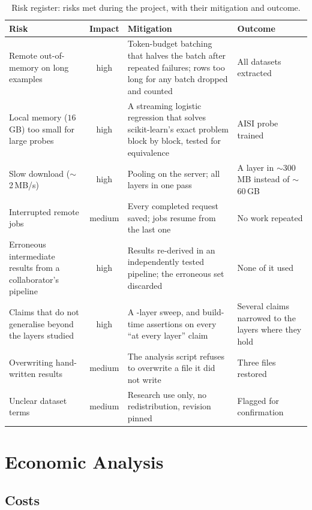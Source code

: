 \begin{table}[t]
\centering
\small
\caption{Risk register: risks met during the project, with their mitigation and outcome.}
\label{tab:risk}
\begin{tabularx}{\linewidth}{@{}>{\raggedright\arraybackslash}p{3.0cm} c >{\raggedright\arraybackslash}X >{\raggedright\arraybackslash}p{3.1cm}@{}}
\toprule
Risk & Impact & Mitigation & Outcome \\
\midrule
Remote out-of-memory on long examples & high & Token-budget batching that halves the batch after
repeated failures; rows too long for any batch dropped and counted & All datasets extracted \\
Local memory ($16$\,GB) too small for large probes & high & A streaming logistic regression that
solves scikit-learn's exact problem block by block, tested for equivalence & AISI probe trained \\
Slow download ($\sim$2\,MB/s) & high & Pooling on the server; all layers in one pass & A layer in
$\sim$300\,MB instead of $\sim$60\,GB \\
Interrupted remote jobs & medium & Every completed request saved; jobs resume from the last one &
No work repeated \\
Erroneous intermediate results from a collaborator's pipeline & high & Results re-derived in an
independently tested pipeline; the erroneous set discarded & None of it used \\
Claims that do not generalise beyond the layers studied & high & A \V{depth-n}-layer sweep, and
build-time assertions on every ``at every layer'' claim & Several claims narrowed to the layers where
they hold \\
Overwriting hand-written results & medium & The analysis script refuses to overwrite a file it did
not write & Three files restored \\
Unclear dataset terms & medium & Research use only, no redistribution, revision pinned & Flagged
for confirmation \\
\bottomrule
\end{tabularx}
\end{table}

\section{Economic Analysis}
\label{sec:econ}

\subsection{Costs}

